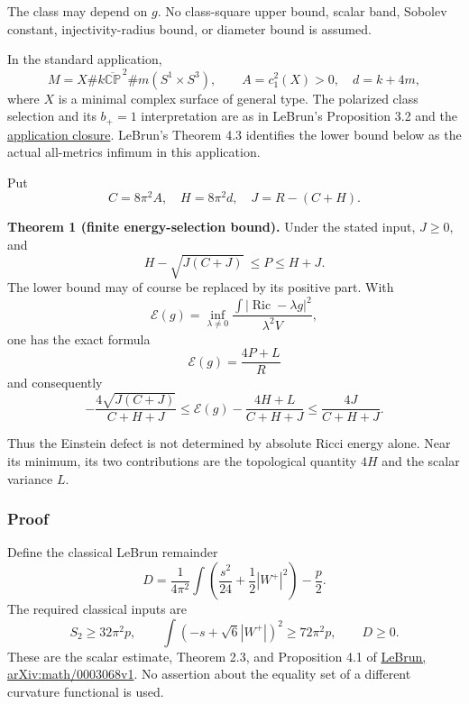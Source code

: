 \documentclass[
  11pt,
]{article}
\begin{document}
The class may depend on \(g\). No class-square upper bound, scalar band,
Sobolev constant, injectivity-radius bound, or diameter bound is
assumed.

In the standard application, \[
 M=X\#k\overline{\mathbb {CP}}^{\,2}
       \#m(S^1\times S^3),\qquad
 A=c_1^2(X)>0,\quad d=k+4m,
 \tag{2}
\] where \(X\) is a minimal complex surface of general type. The
polarized class selection and its \(b_+=1\) interpretation are as in
LeBrun's Proposition 3.2 and the
\href{lebrun_stability_closure.md}{application closure}. LeBrun's
Theorem 4.3 identifies the lower bound below as the actual all-metrics
infimum in this application.

Put \[
 C=8\pi^2A,\quad H=8\pi^2d,\quad
 J=R-(C+H).
 \tag{3}
\]

\textbf{Theorem 1 (finite energy-selection bound).} Under the stated
input, \(J\ge0\), and \[
 \boxed{\quad
 H-\sqrt{J(C+J)}\ \le P\le H+J .
 \quad} \tag{4}
\] The lower bound may of course be replaced by its positive part. With
\[
 \mathcal E(g)=\inf_{\lambda\ne0}
 \frac{\int|\operatorname{Ric}-\lambda g|^2}{\lambda^2 V},
 \tag{5}
\] one has the exact formula \[
 \mathcal E(g)=\frac{4P+L}{R}
 \tag{6}
\] and consequently \[
 \boxed{
 -\frac{4\sqrt{J(C+J)}}{C+H+J}
 \le
 \mathcal E(g)-\frac{4H+L}{C+H+J}
 \le\frac{4J}{C+H+J}.}
 \tag{7}
\]

Thus the Einstein defect is not determined by absolute Ricci energy
alone. Near its minimum, its two contributions are the topological
quantity \(4H\) and the scalar variance \(L\).

\hypertarget{proof}{%
\subsubsection{Proof}\label{proof}}

Define the classical LeBrun remainder \[
 D=\frac1{4\pi^2}\int
       \left(\frac{s^2}{24}+\frac12|W^+|^2\right)-\frac p2.
 \tag{8}
\] The required classical inputs are \[
 S_2\ge32\pi^2p,\qquad
 \int(-s+\sqrt6|W^+|)^2\ge72\pi^2p,\qquad D\ge0.
 \tag{9}
\] These are the scalar estimate, Theorem 2.3, and Proposition 4.1 of
\href{https://arxiv.org/pdf/math/0003068}{LeBrun, arXiv:math/0003068v1}.
No assertion about the equality set of a different curvature functional
is used.
\end{document}

